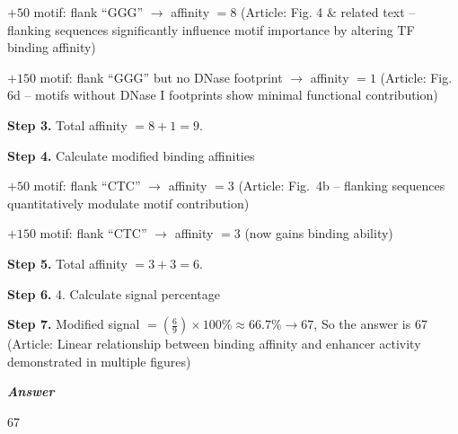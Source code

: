 \begin{tcolorbox}[
    breakable,
    title=Example of Scientific Deep Research in Life,
    colback=LighterGray,
    colframe=DeepPurple,
    colbacktitle=DeepPurple,
    coltitle=White,
]
$+50$ motif: flank ``GGG'' $\rightarrow$ affinity $= 8$ (Article: Fig. 4 \& related text -- flanking sequences significantly influence motif importance by altering TF binding affinity)

$+150$ motif: flank ``GGG'' but no DNase footprint $\rightarrow$ affinity $= 1$ (Article: Fig. 6d -- motifs without DNase I footprints show minimal functional contribution)

\textbf{\textcolor{CaseOrange}{Step 3.}} Total affinity $= 8 + 1 = 9$.

\textbf{\textcolor{CaseOrange}{Step 4.}} Calculate modified binding affinities

$+50$ motif: flank ``CTC'' $\rightarrow$ affinity $= 3$ (Article: Fig.~4b -- flanking sequences quantitatively modulate motif contribution)

$+150$ motif: flank ``CTC'' $\rightarrow$ affinity $= 3$ (now gains binding ability)

\textbf{\textcolor{CaseOrange}{Step 5.}} Total affinity $= 3 + 3 = 6$.

\textbf{\textcolor{CaseOrange}{Step 6.}} 4. Calculate signal percentage

\textbf{\textcolor{CaseOrange}{Step 7.}} Modified signal $= \left(\frac{6}{9}\right) \times 100\% \approx 66.7\% \rightarrow 67$, So the answer is 67 (Article: Linear relationship between binding affinity and enhancer activity demonstrated in multiple figures)


\textbf{\emph{\textcolor{DeepPurple}{Answer}}}

67

\end{tcolorbox}
